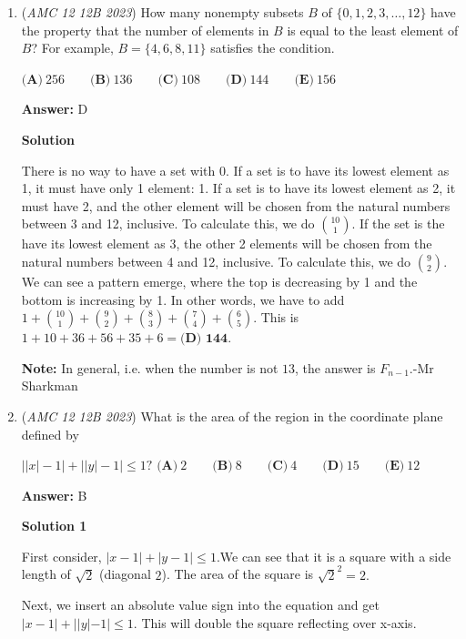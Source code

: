 \begin{enumerate}
	\item (\textit{AMC 12 12B 2023}) How many nonempty subsets $B$ of $\{0, 1, 2, 3, \dots, 12\}$ have the property that the number of elements in $B$ is equal to the least element of $B$? For example, $B = \{4, 6, 8, 11\}$ satisfies the condition.


 $\textbf{(A)}\ 256 \qquad\textbf{(B)}\ 136 \qquad\textbf{(C)}\ 108 \qquad\textbf{(D)}\ 144 \qquad\textbf{(E)}\ 156$

 \textbf{Answer: }D



\textbf{Solution}

There is no way to have a set with 0. If a set is to have its lowest element as 1, it must have only 1 element: 1. If a set is to have its lowest element as 2, it must have 2, and the other element will be chosen from the natural numbers between 3 and 12, inclusive. To calculate this, we do $\binom{10}{1}$. If the set is the have its lowest element as 3, the other 2 elements will be chosen from the natural numbers between 4 and 12, inclusive. To calculate this, we do $\binom{9}{2}$. We can see a pattern emerge, where the top is decreasing by 1 and the bottom is increasing by 1. In other words, we have to add $1 + \binom{10}{1} + \binom{9}{2} + \binom{8}{3} + \binom{7}{4} + \binom{6}{5}$. This is $1+10+36+56+35+6 = \boxed{\textbf{(D) 144}}$.

 \textbf{Note:} In general, i.e. when the number is not $13$, the answer is $F_{n-1}$.-Mr Sharkman

 


 


	\item (\textit{AMC 12 12B 2023}) What is the area of the region in the coordinate plane defined by


 $\left||x|-1\right|+\left||y|-1\right|\leq 1?$
$\textbf{(A)}~2\qquad\textbf{(B)}~8\qquad\textbf{(C)}~4\qquad\textbf{(D)}~15\qquad\textbf{(E)}~12$

 \textbf{Answer: }B



\textbf{Solution 1}

First consider, $|x-1|+|y-1| \le 1.$We can see that it is a square with a side length of $\sqrt{2}$ (diagonal $2$). The area of the square is $\sqrt{2}^2 = 2.$

 Next, we insert an absolute value sign into the equation and get $|x-1|+||y|-1| \le 1.$ This will double the square reflecting over x-axis.


\end{enumerate}
